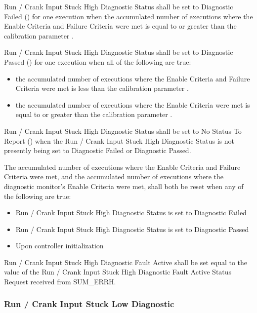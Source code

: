{Run / Crank Input Stuck High Diagnostic Status shall be set to Diagnostic Failed () for one execution when the accumulated number of executions where the Enable Criteria and Failure Criteria were met is equal to or greater than the calibration parameter .

Run / Crank Input Stuck High Diagnostic Status shall be set to Diagnostic Passed () for one execution when all of the following are true:
\begin{itemize}
\item the accumulated number of executions where the Enable Criteria and Failure Criteria were met is less than the calibration parameter .
\item the accumulated number of executions where the Enable Criteria were met is equal to or greater than the calibration parameter .
\end{itemize}

Run / Crank Input Stuck High Diagnostic Status shall be set to No Status To Report () when the Run / Crank Input Stuck High Diagnostic Status is not presently being set to Diagnostic Failed or Diagnostic Passed.

The accumulated number of executions where the Enable Criteria and Failure Criteria were met, and the accumulated number of executions where the diagnostic monitor's Enable Criteria were met, shall both be reset when any of the following are true:
\begin{itemize}
\item Run / Crank Input Stuck High Diagnostic Status is set to Diagnostic Failed
\item Run / Crank Input Stuck High Diagnostic Status is set to Diagnostic Passed
\item Upon controller initialization
\end{itemize}
}
{   }

{Run / Crank Input Stuck High Diagnostic Fault Active shall be set equal to the value of the Run / Crank Input Stuck High Diagnostic Fault Active Status Request received from SUM_ERRH.
}
{}

\subsubsection{Run / Crank Input Stuck Low Diagnostic}

